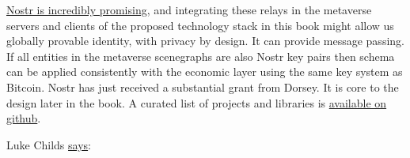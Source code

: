 \href{https://www.forbes.com/sites/rogerhuang/2022/12/29/nostr-is-the-decentralized-protocol-that-might-replace-elon-musks-twitter/}{Nostr is incredibly promising}, and integrating these relays in the metaverse servers and clients of the proposed technology stack in this book might allow us globally provable identity, with privacy by design. It can provide message passing. If all entities in the metaverse scenegraphs are also Nostr key pairs then schema can be applied consistently with the economic layer using the same key system as Bitcoin. Nostr has just received a substantial grant from Dorsey. It is core to the design later in the book. A curated list of projects and libraries is \href{https://github.com/aljazceru/awesome-nostr}{available on github}.\par
Luke Childs \href{https://github.com/nostr-protocol/nips/issues/154}{says}:
